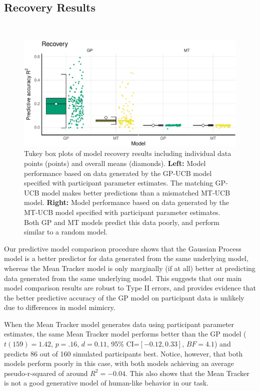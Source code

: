 \subsection*{Recovery Results} \hspace*{\fill} \\
\begin{figure}[ht!]
\centering
\includegraphics[width=0.8\linewidth]{recoverycompare.pdf}
\caption{Tukey box plots of model recovery results including individual data points (points) and overall means (diamonds). \textbf{Left:} Model performance based on data generated by the GP-UCB model specified with participant parameter estimates. The matching GP-UCB model makes better predictions than a mismatched MT-UCB model. \textbf{Right:} Model performance based on data generated by the MT-UCB model specified with participant parameter estimates. Both GP and MT models predict this data poorly, and perform similar to a random model.} 
\label{fig:recovercompare}
\vspace{-1mm}
\end{figure}

Our predictive model comparison procedure shows that the Gaussian Process model is a better predictor for data generated from the same underlying model, whereas the Mean Tracker model is only marginally (if at all) better at predicting data generated from the same underlying model. This suggests that our main model comparison results are robust to Type II errors, and provides evidence that the better predictive accuracy of the GP model on participant data is unlikely due to differences in model mimicry.

When the Mean Tracker model generates data using participant parameter estimates, the same Mean Tracker model performs better than the GP model ($t(159)=1.42$, $p=.16$, $d=0.11$, 95\% CI=$[-0.12, 0.33]$, $BF=4.1$) and predicts 86 out of 160 simulated participants best. Notice, however, that both models perform poorly in this case, with both models achieving an average pseudo-r-squared of around $R^2=-0.04$. This also shows that the Mean Tracker is not a good generative model of human-like behavior in our task.


